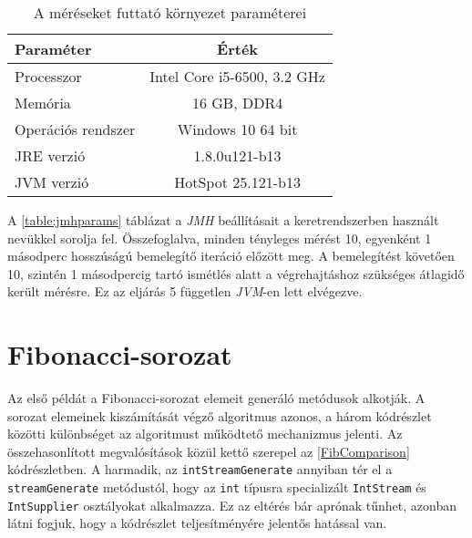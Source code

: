 \begin{table}[h]
\captionsetup{justification=centering}
\centering
  \begin{tabular}{|| l | c ||}
  \hline
  Paraméter & Érték \\
  \hline \hline
  Processzor                  & Intel Core i5-6500, 3.2 GHz \\
  Memória                     & 16 GB, DDR4 \\
  \hline
  Operációs rendszer                        & Windows 10 64 bit \\
  \hline
  JRE verzió                  & 1.8.0u121-b13 \\
  JVM verzió                  & HotSpot 25.121-b13 \\
  \hline
  \end{tabular}
\caption{A méréseket futtató környezet paraméterei}  
\label{table:envparams}
\end{table}

A \ref{table:jmhparams} táblázat a \textit{JMH} beállításait a keretrendszerben használt nevükkel sorolja fel. Összefoglalva, minden tényleges mérést 10, egyenként 1 másodperc hosszúságú bemelegítő iteráció előzött meg. A bemelegítést követően 10, szintén 1 másodpercig tartó ismétlés alatt a végrehajtáshoz szükséges átlagidő került mérésre. Ez az eljárás 5 független \textit{JVM}-en lett elvégezve.

\section{Fibonacci-sorozat}

Az első példát a Fibonacci-sorozat elemeit generáló metódusok alkotják. A sorozat elemeinek kiszámítását végző algoritmus azonos, a három kódrészlet közötti különbséget az algoritmust működtető mechanizmus jelenti. Az összehasonlított megvalósítások közül kettő szerepel az \ref{FibComparison} kódrészletben. A harmadik, az \texttt{intStreamGenerate} annyiban tér el a \texttt{streamGenerate} metódustól, hogy az \texttt{int} típusra specializált \texttt{IntStream} és \texttt{IntSupplier} osztályokat alkalmazza. Ez az eltérés bár aprónak tűnhet, azonban látni fogjuk, hogy a kódrészlet teljesítményére jelentős hatással van.

